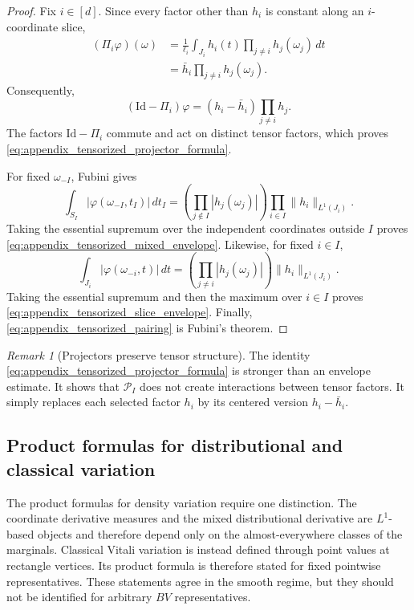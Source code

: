 \documentclass[11pt,letterpaper]{article}
\theoremstyle{definition}
\theoremstyle{remark}
\newtheorem{remark}[theorem]{Remark}
\newcommand{\Id}{\mathrm{Id}}
\begin{document}
\begin{proof}
Fix $i\in[d]$. Since every factor other than $h_i$ is constant along an
$i$-coordinate slice,
$$
\begin{aligned}
(\Pi_i\varphi)(\omega)
&=
\frac1{\ell_i}
\int_{J_i}
 h_i(t)\prod_{j\neq i}h_j(\omega_j)\,dt
\\
&=
\bar h_i\prod_{j\neq i}h_j(\omega_j).
\end{aligned}
$$
Consequently,
$$
(\Id-\Pi_i)\varphi
=
(h_i-\bar h_i)\prod_{j\neq i}h_j.
$$
The factors $\Id-\Pi_i$ commute and act on distinct tensor factors, which
proves \eqref{eq:appendix_tensorized_projector_formula}.

For fixed $\omega_{-I}$, Fubini gives
$$
\int_{S_I}|\varphi(\omega_{-I},t_I)|\,dt_I
=
\left(\prod_{j\notin I}|h_j(\omega_j)|\right)
\prod_{i\in I}\|h_i\|_{L^1(J_i)}.
$$
Taking the essential supremum over the independent coordinates outside $I$
proves \eqref{eq:appendix_tensorized_mixed_envelope}. Likewise, for fixed
$i\in I$,
$$
\int_{J_i}|\varphi(\omega_{-i},t)|\,dt
=
\left(\prod_{j\neq i}|h_j(\omega_j)|\right)
\|h_i\|_{L^1(J_i)}.
$$
Taking the essential supremum and then the maximum over $i\in I$ proves
\eqref{eq:appendix_tensorized_slice_envelope}. Finally,
\eqref{eq:appendix_tensorized_pairing} is Fubini's theorem.
\end{proof}

\begin{remark}[Projectors preserve tensor structure]
\label{rem:appendix_projectors_preserve_tensor_structure}
The identity \eqref{eq:appendix_tensorized_projector_formula} is stronger than
an envelope estimate. It shows that $\mathcal P_I$ does not create interactions
between tensor factors. It simply replaces each selected factor $h_i$ by its
centered version $h_i-\bar h_i$.
\end{remark}

  
\subsection{Product formulas for distributional and classical variation}
\label{subsec:appendix_product_variation}
  

The product formulas for density variation require one distinction. The
coordinate derivative measures and the mixed distributional derivative are
$L^1$-based objects and therefore depend only on the almost-everywhere classes
of the marginals. Classical Vitali variation is instead defined through point
values at rectangle vertices. Its product formula is therefore stated for
fixed pointwise representatives. These statements agree in the smooth regime,
but they should not be identified for arbitrary $BV$ representatives.
\end{document}
